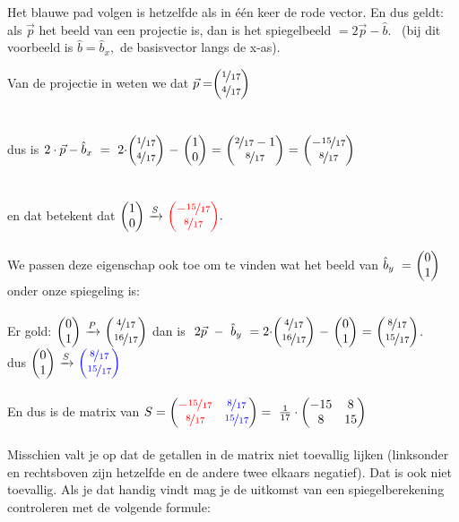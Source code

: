  { Het blauwe pad volgen is hetzelfde als  in één keer de rode vector.  
	En dus geldt: als $  \vec{p} $ het beeld van een projectie is, dan is het spiegelbeeld $ =  2\vec{p} - \hat{b}.  $ \  (bij dit voorbeeld  is $ \hat{b} = \hat{b}_x , $ de basisvector langs de x-as). }  

Van de projectie in \RT weten we dat 
$ \vec{p} = \vectwee{ \nicefrac{1}{17} } { \nicefrac{4}{17} } \  $ \\ \\ \\dus is 
$ 2\cdot \vec{p} -  \hat{b}_x
\  =  \   2\cdot \vectwee{ \nicefrac{1}{17} } { \nicefrac{4}{17} } \ - \ \vectwee{1}{0} 
\ = \    \vectwee{ \nicefrac{2}{17} -1 } {\nicefrac{8}{17}} 
\ = \    \vectwee{ -\nicefrac{15}{17} } {\nicefrac{8}{17}} 
$ \\ \\ \\
en dat betekent dat   $ \vectwee{1}{0}  \  \xrightarrow{S}   
\  \vectwee[red]{ -\nicefrac{15}{17} } {\nicefrac{8}{17}} . $ \\ \\
We passen deze eigenschap ook toe om te vinden wat het beeld van  $  \hat{b}_y\ = \ \vectwee{0}{1} $ onder onze spiegeling is:\\ \\
Er gold:  $ \vectwee{0}{1}   \  \xrightarrow{P}  \ 
\vectwee{\nicefrac{4} {17} } {\nicefrac {16} {17}} $
\qquad  dan is $  \  2\vec{p} \ - \  \hat{b}_y \ 
= 2 \cdot \vectwee{ \nicefrac {4} {17} } { \nicefrac {16} {17}} \ - \ \vectwee{0}{1}  \ 
= \  \vectwee{\nicefrac{8}{17} } {\nicefrac{15}{17}}  $. \\

\quad dus  $ \vectwee{0}{1}   \  \xrightarrow{S}  \
\vectwee[blue]{\nicefrac{8}{17} } {\nicefrac{15}{17} } $ 
\\ \\
En dus is de matrix van 
$ S = \begin{pmatrix}  
	{\color{red} - \nicefrac{15}{17}} & { \color{blue}\nicefrac{8}{17}}  \\  {\color{red} \nicefrac{8}{17} } & { \color{blue} \nicefrac{15}{17} }  \end{pmatrix} 
 = \ \frac{1}{17} \cdot   \begin{pmatrix} -15&8 \\ 8&15 \end{pmatrix} $\\ \\
Misschien valt je op dat de getallen in de matrix niet toevallig lijken (linksonder en rechtsboven zijn hetzelfde en de andere twee elkaars negatief). Dat is ook niet toevallig. Als je dat handig vindt mag je de uitkomst van een spiegelberekening controleren met de volgende formule:\\

